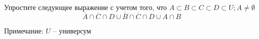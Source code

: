 \question
Упростите следующее выражение с учетом того, что $A\subset B \subset C \subset D \subset U; A \neq \emptyset$
\begin{equation*}
	\overline{A} \cap \overline{C} \cap D \cup \overline{B} \cap \overline{C} \cap D \cup A \cap B
\end{equation*}

Примечание: $U$ -- универсум